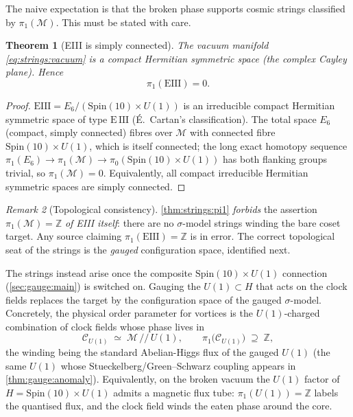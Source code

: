 \documentclass[11pt]{article}
\theoremstyle{plain}
\newtheorem{theorem}{Theorem}[section]
\theoremstyle{definition}
\theoremstyle{remark}
\newtheorem{remark}[theorem]{Remark}
\begin{document}
The naive expectation is that the broken phase supports cosmic strings
classified by $\pi_{1}(\mathcal{M})$. This must be stated with care.

\begin{theorem}[EIII is simply connected]
\label{thm:strings:pi1}
The vacuum manifold \eqref{eq:strings:vacuum} is a compact Hermitian
symmetric space (the complex Cayley plane). Hence
\[
   \pi_{1}(\mathrm{EIII})=0 .
\]
\end{theorem}

\begin{proof}
$\mathrm{EIII}=E_{6}/(\mathrm{Spin}(10)\times U(1))$ is an irreducible
compact Hermitian symmetric space of type $\mathrm{E\,III}$
(\'E.~Cartan's classification). The total space $E_{6}$ (compact, simply
connected) fibres over $\mathcal{M}$ with connected fibre
$\mathrm{Spin}(10)\times U(1)$, which is itself connected; the long exact
homotopy sequence
$\pi_{1}(E_{6})\to\pi_{1}(\mathcal{M})\to\pi_{0}(\mathrm{Spin}(10)\times
U(1))$ has both flanking groups trivial, so $\pi_{1}(\mathcal{M})=0$.
Equivalently, all compact irreducible Hermitian symmetric spaces are
simply connected.
\end{proof}

\begin{remark}[Topological consistency]
\label{rem:strings:guard}
\autoref{thm:strings:pi1} \emph{forbids} the assertion
$\pi_{1}(\mathcal{M})=\mathbb{Z}$ \emph{of EIII itself}: there are no
$\sigma$-model strings winding the bare coset target. Any source claiming
$\pi_{1}(\mathrm{EIII})=\mathbb{Z}$ is in error. The correct topological
seat of the strings is the \emph{gauged} configuration space, identified
next.
\end{remark}

The strings instead arise once the composite $\mathrm{Spin}(10)\times
U(1)$ connection (\autoref{sec:gauge:main}) is switched on. Gauging the
$U(1)\subset H$ that acts on the clock fields replaces the target by the
configuration space of the gauged $\sigma$-model. Concretely, the
physical order parameter for vortices is the $U(1)$-charged combination
of clock fields whose phase lives in
\[
   \mathcal{C}_{U(1)} \;\simeq\; \mathcal{M}\,/\!/\,U(1),
   \qquad
   \pi_{1}\bigl(\mathcal{C}_{U(1)}\bigr)\;\supseteq\;\mathbb{Z},
   \label{eq:strings:config}
\]
the winding being the standard Abelian-Higgs flux of the gauged $U(1)$
(the same $U(1)$ whose Stueckelberg/Green--Schwarz coupling appears in
\autoref{thm:gauge:anomaly}). Equivalently, on the broken vacuum the
$U(1)$ factor of $H=\mathrm{Spin}(10)\times U(1)$ admits a magnetic flux
tube: $\pi_{1}(U(1))=\mathbb{Z}$ labels the quantised flux, and the clock
field winds the eaten phase around the core.
\end{document}

